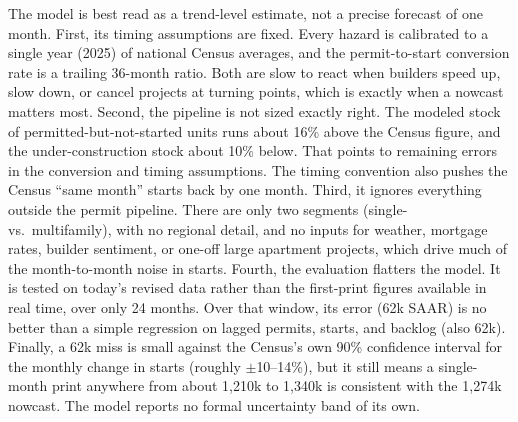 \documentclass[11pt]{article}
\begin{document}
The model is best read as a trend-level estimate, not a precise forecast of
one month. First, its timing assumptions are fixed. Every hazard is calibrated
to a single year (2025) of national Census averages, and the permit-to-start
conversion rate is a trailing 36-month ratio. Both are slow to react when
builders speed up, slow down, or cancel projects at turning points, which is
exactly when a nowcast matters most. Second, the pipeline is not sized
exactly right. The modeled stock of permitted-but-not-started units runs about
16\% above the Census figure, and the under-construction stock about 10\%
below. That points to remaining errors in the conversion and timing
assumptions. The timing convention also pushes the Census ``same month''
starts back by one month. Third, it ignores everything outside the permit
pipeline. There are only two segments (single- vs.\ multifamily), with no
regional detail, and no inputs for weather, mortgage rates, builder
sentiment, or one-off large apartment projects, which drive much of the
month-to-month noise in starts. Fourth, the evaluation flatters the model. It
is tested on today's revised data rather than the first-print figures
available in real time, over only 24 months. Over that window, its error
(62k SAAR) is no better than a simple regression on lagged permits, starts,
and backlog (also 62k). Finally, a 62k miss is small against the Census's own
90\% confidence interval for the monthly change in starts (roughly
$\pm$10--14\%), but it still means a single-month print anywhere from about
1{,}210k to 1{,}340k is consistent with the 1{,}274k nowcast. The model
reports no formal uncertainty band of its own.
\end{document}
